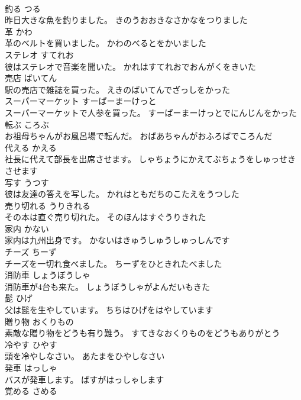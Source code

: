 \documentclass[8pt]{extreport}
\begin{document}
\begin{CJK}{UTF8}{min}
\\	釣る	つる	
\\	昨日大きな魚を釣りました。	きのうおおきなさかなをつりました	
\\	革	かわ	
\\	革のベルトを買いました。	かわのべるとをかいました	
\\	ステレオ	すてれお	
\\	彼はステレオで音楽を聞いた。	かれはすてれおでおんがくをきいた	
\\	売店	ばいてん	
\\	駅の売店で雑誌を買った。	えきのばいてんでざっしをかった	
\\	スーパーマーケット	すーぱーまーけっと	
\\	スーパーマーケットで人参を買った。	すーぱーまーけっとでにんじんをかった	
\\	転ぶ	ころぶ	
\\	お祖母ちゃんがお風呂場で転んだ。	おばあちゃんがおふろばでころんだ	
\\	代える	かえる	
\\	社長に代えて部長を出席させます。	しゃちょうにかえてぶちょうをしゅっせきさせます	
\\	写す	うつす	
\\	彼は友達の答えを写した。	かれはともだちのこたえをうつした	
\\	売り切れる	うりきれる	
\\	その本は直ぐ売り切れた。	そのほんはすぐうりきれた	
\\	家内	かない	
\\	家内は九州出身です。	かないはきゅうしゅうしゅっしんです	
\\	チーズ	ちーず	
\\	チーズを一切れ食べました。	ちーずをひときれたべました	
\\	消防車	しょうぼうしゃ	
\\	消防車が4台も来た。	しょうぼうしゃがよんだいもきた	
\\	髭	ひげ	
\\	父は髭を生やしています。	ちちはひげをはやしています	
\\	贈り物	おくりもの	
\\	素敵な贈り物をどうも有り難う。	すてきなおくりものをどうもありがとう	
\\	冷やす	ひやす	
\\	頭を冷やしなさい。	あたまをひやしなさい	
\\	発車	はっしゃ	
\\	バスが発車します。	ばすがはっしゃします	
\\	覚める	さめる	

\end{CJK}
\end{document}
